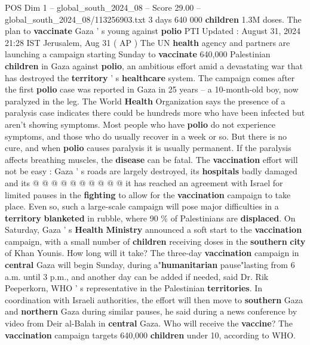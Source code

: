 \begin{textsample}{POS Dim 1 – global\_south\_2024\_08 – Score 29.00 – global\_south\_2024\_08/113256903.txt}  \label{ex:f1_pos_325}
3 days 640 000 \textbf{children} 1.3M doses.
The plan to \textbf{vaccinate} Gaza ' s young against \textbf{polio} PTI Updated : August 31, 2024 21:28 IST Jerusalem, Aug 31 ( AP ) The UN \textbf{health} agency and partners are launching a campaign starting Sunday to \textbf{vaccinate} 640,000 Palestinian \textbf{children} in Gaza against \textbf{polio}, an ambitious effort amid a devastating war that has destroyed the \textbf{territory} ' s \textbf{healthcare} system.
The campaign comes after the first \textbf{polio} case was reported in Gaza in 25 years -- a 10-month-old boy, now paralyzed in the leg.
The World \textbf{Health} Organization says the presence of a paralysis case indicates there could be hundreds more who have been infected but aren't showing symptoms.
Most people who have \textbf{polio} do not experience symptoms, and those who do usually recover in a week or so.
But there is no cure, and when \textbf{polio} causes paralysis it is usually permanent.
If the paralysis affects breathing muscles, the \textbf{disease} can be fatal.
The \textbf{vaccination} effort will not be easy : Gaza ' s roads are largely destroyed, its \textbf{hospitals} badly damaged and its @ @ @ @ @ @ @ @ @ @ it has reached an agreement with Israel for limited pauses in the \textbf{fighting} to allow for the \textbf{vaccination} campaign to take place.
Even so, such a large-scale campaign will pose major difficulties in a \textbf{territory} \textbf{blanketed} in rubble, where 90 \% of Palestinians are \textbf{displaced}.
On Saturday, Gaza ' s \textbf{Health} \textbf{Ministry} announced a soft start to the \textbf{vaccination} campaign, with a small number of \textbf{children} receiving doses in the \textbf{southern} \textbf{city} of Khan Younis.
How long will it take?
The three-day \textbf{vaccination} campaign in \textbf{central} Gaza will begin Sunday, during a"\textbf{humanitarian} pause"lasting from 6 a.m. until 3 p.m., and another day can be added if needed, said Dr.
Rik Peeperkorn, WHO ' s representative in the Palestinian \textbf{territories}.
In coordination with Israeli authorities, the effort will then move to \textbf{southern} Gaza and \textbf{northern} Gaza during similar pauses, he said during a news conference by video from Deir al-Balah in \textbf{central} Gaza.
Who will receive the \textbf{vaccine}?
The \textbf{vaccination} campaign targets 640,000 \textbf{children} under 10, according to WHO.

\end{textsample}
